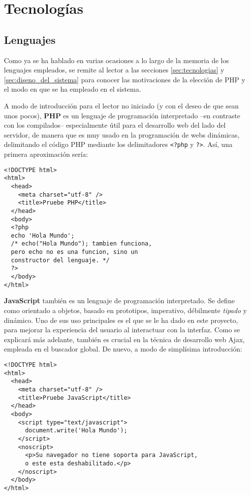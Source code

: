 \section{Tecnologías}

\subsection{Lenguajes}

Como ya se ha hablado en varias ocasiones a lo largo de la memoria de los
lenguajes empleados, se remite al lector a las secciones \ref{sec:tecnologias}
y \ref{sec:diseno_del_sistema} para conocer las motivaciones de la elección de
PHP y el modo en que se ha empleado en el sistema.

A modo de introducción para el lector no iniciado (y con el deseo de que sean
unos pocos), \textbf{PHP} es un lenguaje de programación interpretado --en
contraste con los compilados-- especialmente útil para el desarrollo web del
lado del servidor, de manera que es muy usado en la programación de webs
dinámicas, delimitando el código PHP mediante los delimitadores
\verb|<?php| y \verb|?>|. Así, una primera aproximación sería:

\begin{lstlisting}
<!DOCTYPE html>
<html>
  <head>
    <meta charset="utf-8" />
    <title>Pruebe PHP</title>
  </head>
  <body>
  <?php
  echo 'Hola Mundo';
  /* echo("Hola Mundo"); tambien funciona,
  pero echo no es una funcion, sino un
  constructor del lenguaje. */
  ?>
  </body>
</html>
\end{lstlisting}

\textbf{JavaScript} también es un lenguaje de programación interpretado. Se
define como orientado a objetos, basado en prototipos, imperativo, débilmente
\textit{tipado} y dinámico. Uno de sus uso principales es el que se le ha dado
en este proyecto, para mejorar la experiencia del usuario al interactuar con la
interfaz. Como se explicará más adelante, también es crucial en la técnica de
desarrollo web Ajax, empleada en el buscador global. De nuevo, a modo de
simplísima introducción:

\begin{lstlisting}
<!DOCTYPE html>
<html>
  <head>
    <meta charset="utf-8" />
    <title>Pruebe JavaScript</title>
  </head>
  <body>
    <script type="text/javascript">
      document.write('Hola Mundo');
    </script>
    <noscript>
      <p>Su navegador no tiene soporta para JavaScript, 
      o este esta deshabilitado.</p>
    </noscript>
  </body>
</html>
\end{lstlisting}

